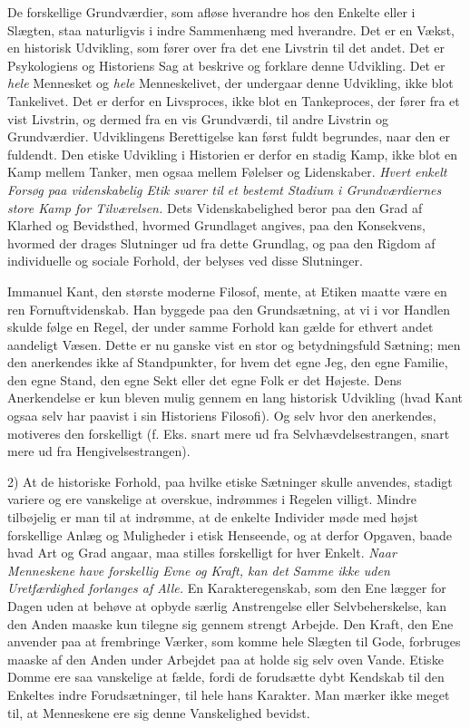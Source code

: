 \documentclass[12pt,a4paper,openany]{book}
\newcommand{\opage}[1]{\marginnote{\footnotesize\textit{[#1]}}}
\begin{document}
De forskellige Grundværdier, som afløse hverandre hos den
Enkelte eller i Slægten, staa naturligvis i indre Sammenhæng
med hverandre. Det er en Vækst, en historisk Udvikling, som
fører over fra det ene Livstrin til det andet. Det er Psykologiens
og Historiens Sag at beskrive og forklare denne Udvikling.
Det er \textit{hele} Mennesket og \textit{hele} Menneskelivet, der undergaar
denne Udvikling, ikke blot Tankelivet. Det er derfor en
Livsproces, ikke blot en Tankeproces, der fører fra et vist
Livstrin, og dermed fra en vis Grundværdi, til andre Livstrin
og Grundværdier. Udviklingens Berettigelse kan først fuldt begrundes,
naar den er fuldendt. Den etiske Udvikling i Historien
er derfor en stadig Kamp, ikke blot en Kamp mellem Tanker,
men ogsaa mellem Følelser og Lidenskaber. \textit{Hvert enkelt Forsøg
paa videnskabelig Etik svarer til et bestemt Stadium i Grundværdiernes
store Kamp for Tilværelsen.} Dets Videnskabelighed beror
paa den Grad af Klarhed og Bevidsthed, hvormed Grundlaget
angives, paa den Konsekvens, hvormed der drages Slutninger
ud fra dette Grundlag, og paa den Rigdom af individuelle og
sociale Forhold, der belyses ved disse Slutninger.

Immanuel Kant, den største moderne Filosof, mente, at
Etiken maatte være en ren Fornuftvidenskab. Han byggede paa
den Grundsætning, at vi i vor Handlen skulde følge en Regel,
der under samme Forhold kan gælde for ethvert andet aandeligt
Væsen. Dette er nu ganske vist en stor og betydningsfuld Sætning;
men den anerkendes ikke af Standpunkter, for hvem det
egne Jeg, den egne Familie, den egne Stand, den egne Sekt
eller det egne Folk er det Højeste. Dens Anerkendelse er kun
bleven mulig gennem en lang historisk Udvikling (hvad Kant
ogsaa selv har paavist i sin Historiens Filosofi). Og selv hvor
den anerkendes, motiveres den forskelligt (f. Eks. snart mere ud
fra Selvhævdelsestrangen, snart mere ud fra Hengivelsestrangen).

2) At de historiske Forhold, paa hvilke etiske Sætninger
\setcounter{footnote}{0}%
\opage{63}skulle anvendes, stadigt variere og ere vanskelige at overskue,
indrømmes i Regelen villigt. Mindre tilbøjelig er man til at
indrømme, at de enkelte Individer møde med højst forskellige
Anlæg og Muligheder i etisk Henseende, og at derfor Opgaven,
baade hvad Art og Grad angaar, maa stilles forskelligt for hver
Enkelt. \textit{Naar Menneskene have forskellig Evne og Kraft, kan det
Samme ikke uden Uretfærdighed forlanges af Alle.} En Karakteregenskab,
som den Ene lægger for Dagen uden at behøve at
opbyde særlig Anstrengelse eller Selvbeherskelse, kan den Anden
maaske kun tilegne sig gennem strengt Arbejde. Den Kraft, den
Ene anvender paa at frembringe Værker, som komme hele
Slægten til Gode, forbruges maaske af den Anden under Arbejdet
paa at holde sig selv oven Vande. Etiske Domme ere
saa vanskelige at fælde, fordi de forudsætte dybt Kendskab til
den Enkeltes indre Forudsætninger, til hele hans Karakter. Man
mærker ikke meget til, at Menneskene ere sig denne Vanskelighed
bevidst.
\end{document}

